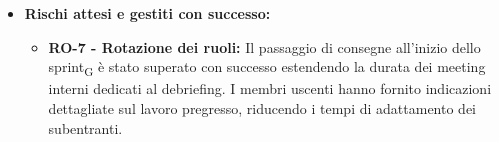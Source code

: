 \documentclass[a4paper, 10pt, colorlinks=true, linkcolor=black, urlcolor=blue, citecolor=blue, hidelinks]{article}
\begin{document}
\begin{itemize}
\begin{itemize}
\begin{itemize}
            \item \textbf{Impatto:} Contenuto. Ha generato inefficienze temporanee nel flusso di approvazione, risolte senza impattare sulle scadenze di fine sprint\textsubscript{G}.
        \end{itemize}
    \end{itemize}
    \item \textbf{Rischi attesi e gestiti con successo:}
    \begin{itemize}
        \item \textbf{RO-7 - Rotazione dei ruoli:} Il passaggio di consegne all'inizio dello sprint\textsubscript{G} è stato superato con successo estendendo la durata dei meeting interni dedicati al debriefing. I membri uscenti hanno fornito indicazioni dettagliate sul lavoro pregresso, riducendo i tempi di adattamento dei subentranti.
    \end{itemize}
\end{itemize}
\end{document}
